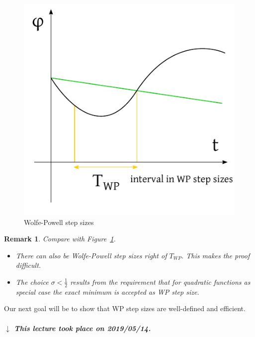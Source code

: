 \documentclass[a4paper]{article}
\numberwithin{lecref}{subsection}
\newtheorem*{Remark}{Remark}
\newcommand{\dateref}[1]{%
  \begin{mdframed}[backgroundcolor=gray!10,innerbottommargin=0pt,innertopmargin=0pt]
    \paragraph{\textit{$\downarrow$ This lecture took place on #1.}}%
  \end{mdframed}%
}
\begin{document}
\begin{figure}[t]
	\begin{center}
		\includegraphics{img/31_wp.pdf}
		\caption{Wolfe-Powell step sizes}
		\label{img:wp}
	\end{center}
\end{figure}

\begin{Remark}
	Compare with Figure~\ref{img:wp}.

	\begin{itemize}
		\item There can also be Wolfe-Powell step sizes right of $T_{WP}$. This makes the proof difficult.
		\item The choice $\sigma < \frac12$ results from the requirement that for quadratic functions as special case the exact minimum is accepted as WP step size.
	\end{itemize}
\end{Remark}

Our next goal will be to show that WP step sizes are well-defined and efficient.

\dateref{2019/05/14}
\end{document}
